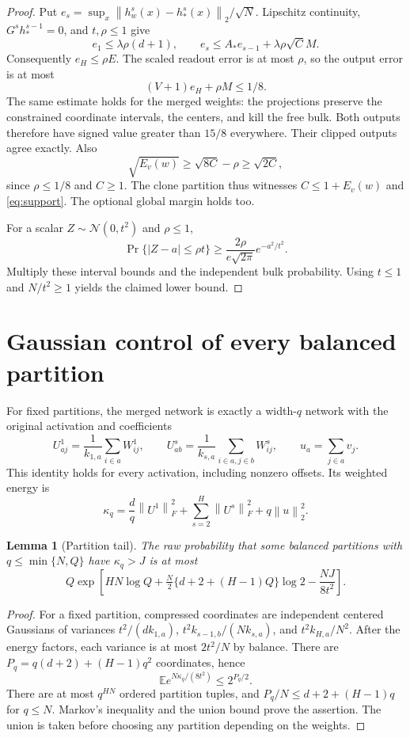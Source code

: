 \documentclass[11pt]{article}
\newtheorem{lemma}[theorem]{Lemma}
\newcommand{\E}{\mathbb E}
\newcommand{\norm}[1]{\left\lVert#1\right\rVert}
\begin{document}
\begin{proof}
Put $e_s=\sup_x\norm{h_w^s(x)-h_*^s(x)}_2/\sqrt N$.
Lipschitz continuity, $G^sh_*^{s-1}=0$, and $t,\rho\le1$ give
\[
 e_1\le\lambda\rho(d+1),\qquad
 e_s\le A_*e_{s-1}+\lambda\rho\sqrt C M.
\]
Consequently $e_H\le\rho E$. The scaled readout error is at most $\rho$,
so the output error is at most
\[
 (V+1)e_H+\rho M\le1/8.
\]
The same estimate holds for the merged weights: the projections preserve
the constrained coordinate intervals, the centers, and kill the free bulk.
Both outputs therefore have signed value greater than $15/8$ everywhere.
Their clipped outputs agree exactly. Also
\[
 \sqrt{E_v(w)}\ge\sqrt{8C}-\rho\ge\sqrt{2C},
\]
since $\rho\le1/8$ and $C\ge1$. The clone partition thus witnesses
$C\le1+E_v(w)$ and \eqref{eq:support}. The optional global margin holds too.

For a scalar $Z\sim\mathcal N(0,t^2)$ and $\rho\le1$,
\[
 \Pr\{|Z-a|\le\rho t\}
 \ge\frac{2\rho}{e\sqrt{2\pi}}e^{-a^2/t^2}.
\]
Multiply these interval bounds and the independent bulk probability.
Using $t\le1$ and $N/t^2\ge1$ yields the claimed lower bound.
\end{proof}

\section{Gaussian control of every balanced partition}
For fixed partitions, the merged network is exactly a width-$q$ network
with the original activation and coefficients
\[
 U^1_{aj}=\frac1{k_{1,a}}\sum_{i\in a}W^1_{ij},\qquad
 U^s_{ab}=\frac1{k_{s,a}}\sum_{i\in a,j\in b}W^s_{ij},\qquad
 u_a=\sum_{j\in a}v_j.
\]
This identity holds for every activation, including nonzero offsets.
Its weighted energy is
\[
 \kappa_q=\frac dq\norm{U^1}_F^2+
             \sum_{s=2}^H\norm{U^s}_F^2+q\norm u_2^2.
\]
\begin{lemma}[Partition tail]\label{lem:partitions}
The raw probability that some balanced partitions with
$q\le\min\{N,Q\}$ have $\kappa_q>J$ is at most
\[
 Q\exp\left[HN\log Q+
 \tfrac N2\{d+2+(H-1)Q\}\log2-\frac{NJ}{8t^2}\right].
\]
\end{lemma}
\begin{proof}
For a fixed partition, compressed coordinates are independent centered
Gaussians of variances $t^2/(dk_{1,a})$,
$t^2k_{s-1,b}/(Nk_{s,a})$, and $t^2k_{H,a}/N^2$.
After the energy factors, each variance is at most $2t^2/N$ by balance.
There are $P_q=q(d+2)+(H-1)q^2$ coordinates, hence
\[
 \E e^{N\kappa_q/(8t^2)}\le2^{P_q/2}.
\]
There are at most $q^{HN}$ ordered partition tuples, and
$P_q/N\le d+2+(H-1)q$ for $q\le N$. Markov's inequality and the union
bound prove the assertion. The union is taken before choosing any
partition depending on the weights.
\end{proof}
\end{document}
